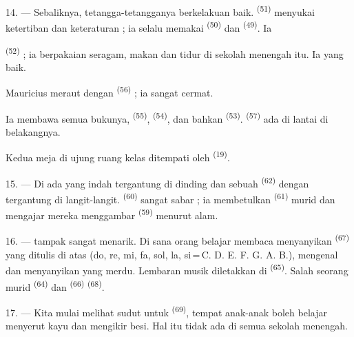 14. --- Sebaliknya, tetangga-tetangganya berkelakuan baik.
 \textsuperscript{(51)} menyukai ketertiban dan
keteraturan ; ia selalu memakai 
\textsuperscript{(50)} dan  \textsuperscript{(49)}.
Ia 

 \textsuperscript{(52)}  ; ia
berpakaian seragam, makan dan tidur di sekolah menengah itu. Ia
 yang baik.

Mauricius meraut  dengan 
\textsuperscript{(56)} ; ia sangat cermat.

Ia membawa semua bukunya, 
\textsuperscript{(55)},  \textsuperscript{(54)},
dan bahkan  \textsuperscript{(53)}.  \textsuperscript{(57)} ada di lantai di belakangnya.

Kedua meja di ujung ruang kelas ditempati oleh  \textsuperscript{(19)}.

\VUsaut{4.6mm}
\VUsaut{3.4mm}

15. --- Di  ada  yang
indah tergantung di dinding dan sebuah 
\textsuperscript{(62)} dengan  tergantung di
langit-langit.  \textsuperscript{(60)} sangat sabar ;
ia membetulkan  \textsuperscript{(61)} murid dan
mengajar mereka menggambar 
\textsuperscript{(59)} menurut alam.

16. ---  tampak sangat menarik. Di sana orang
belajar membaca  menyanyikan 
\textsuperscript{(67)} yang ditulis di atas 
(do, re, mi, fa, sol, la, si\,=\,C. D. E. F. G. A. B.), mengenal
 dan menyanyikan  yang merdu.
Lembaran musik diletakkan di 
\textsuperscript{(65)}. Salah seorang murid 
\textsuperscript{(64)} dan  \textsuperscript{(66)}
 \textsuperscript{(68)}.

17. --- Kita mulai melihat sudut  untuk
 \textsuperscript{(69)}, tempat anak-anak
boleh belajar menyerut kayu dan mengikir besi. Hal itu tidak ada di
semua sekolah menengah.

